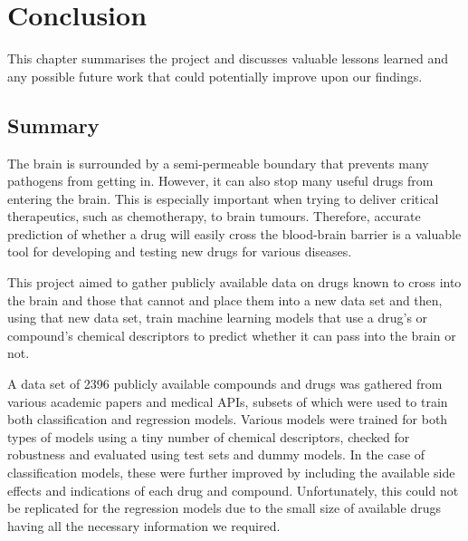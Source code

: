 \chapter{Conclusion}    

This chapter summarises the project and discusses valuable lessons learned and any possible future work that could potentially improve upon our findings. 


\section{Summary}

The brain is surrounded by a semi-permeable boundary that prevents many pathogens from getting in. However, it can also stop many useful drugs from entering the brain. This is especially important when trying to deliver critical therapeutics, such as chemotherapy, to brain tumours. Therefore, accurate prediction of whether a drug will easily cross the blood-brain barrier is a valuable tool for developing and testing new drugs for various diseases.

This project aimed to gather publicly available data on drugs known to cross into the brain and those that cannot and place them into a new data set and then, using that new data set, train machine learning models that use a drug's or compound's chemical descriptors to predict whether it can pass into the brain or not.

A data set of 2396 publicly available compounds and drugs was gathered from various academic papers and medical APIs, subsets of which were used to train both classification and regression models. Various models were trained for both types of models using a tiny number of chemical descriptors, checked for robustness and evaluated using test sets and dummy models. In the case of classification models, these were further improved by including the available side effects and indications of each drug and compound. Unfortunately, this could not be replicated for the regression models due to the small size of available drugs having all the necessary information we required.

